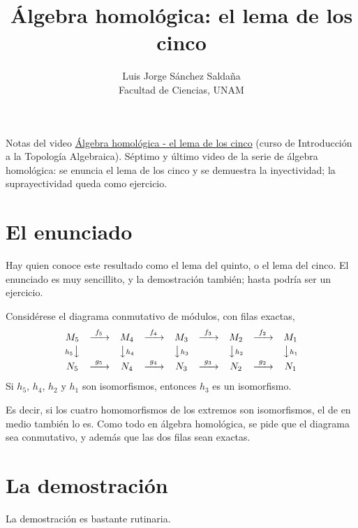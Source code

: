 \documentclass[11pt]{article}
\title{Álgebra homológica: el lema de los cinco}
\author{Luis Jorge Sánchez Saldaña\\[2pt]\small Facultad de Ciencias, UNAM}
\date{}
\begin{document}
\maketitle

\noindent\small Notas del video
\href{https://www.youtube.com/watch?v=UuMSUwn-Z-I}{\guillemotleft{}Álgebra homológica - el lema de los cinco\guillemotright{}}
(curso de Introducción a la Topología Algebraica). Séptimo y último video de la serie de álgebra homológica: se enuncia el lema de los cinco y se demuestra la inyectividad; la suprayectividad queda como ejercicio.
\normalsize

\section*{El enunciado}

Hay quien conoce este resultado como el lema del quinto, o el lema del cinco. El enunciado es muy sencillito, y la demostración también; hasta podría ser un ejercicio.

\begin{lema}\label{lema:cinco}
Considérese el diagrama conmutativo de módulos, con filas exactas,
\[
  \begin{array}{ccccccccc}
    M_5 & \xrightarrow{\ f_5\ } & M_4 & \xrightarrow{\ f_4\ } & M_3 & \xrightarrow{\ f_3\ } & M_2 & \xrightarrow{\ f_2\ } & M_1\\[2pt]
    {\scriptstyle h_5}\big\downarrow & & \big\downarrow{\scriptstyle h_4} & & \big\downarrow{\scriptstyle h_3} & & \big\downarrow{\scriptstyle h_2} & & \big\downarrow{\scriptstyle h_1}\\[2pt]
    N_5 & \xrightarrow{\ g_5\ } & N_4 & \xrightarrow{\ g_4\ } & N_3 & \xrightarrow{\ g_3\ } & N_2 & \xrightarrow{\ g_2\ } & N_1
  \end{array}
\]
Si $h_5$, $h_4$, $h_2$ y $h_1$ son isomorfismos, entonces $h_3$ es un isomorfismo.
\end{lema}

Es decir, si los cuatro homomorfismos de los extremos son isomorfismos, el de en medio también lo es. Como todo en álgebra homológica, se pide que el diagrama sea conmutativo, y además que las dos filas sean exactas.

\section*{La demostración}

La demostración es bastante rutinaria.
\end{document}

